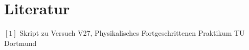 \section{Literatur}
\label{Literatur}

$[1]$ Skript zu Versuch V27, Physikalisches Fortgeschrittenen Praktikum TU Dortmund